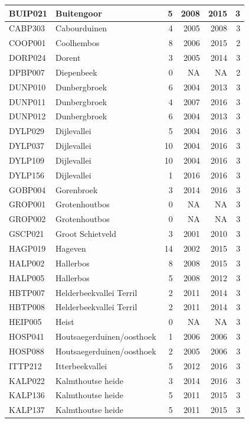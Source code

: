 \documentclass[11pt,]{book}
\begin{document}
\begin{table}
\begin{tabular}[t]{l|l|r|r|r|r}
\hline
BUIP021 & Buitengoor & 5 & 2008 & 2015 & 3\\
\hline
CABP303 & Cabourduinen & 4 & 2005 & 2008 & 3\\
\hline
COOP001 & Coolhembos & 8 & 2006 & 2015 & 2\\
\hline
DORP024 & Dorent & 3 & 2005 & 2014 & 3\\
\hline
DPBP007 & Diepenbeek & 0 & NA & NA & 2\\
\hline
DUNP010 & Dunbergbroek & 6 & 2004 & 2013 & 3\\
\hline
DUNP011 & Dunbergbroek & 4 & 2007 & 2016 & 3\\
\hline
DUNP012 & Dunbergbroek & 6 & 2004 & 2013 & 3\\
\hline
DYLP029 & Dijlevallei & 5 & 2004 & 2016 & 3\\
\hline
DYLP037 & Dijlevallei & 10 & 2004 & 2016 & 3\\
\hline
DYLP109 & Dijlevallei & 10 & 2004 & 2016 & 3\\
\hline
DYLP156 & Dijlevallei & 1 & 2016 & 2016 & 3\\
\hline
GOBP004 & Gorenbroek & 3 & 2014 & 2016 & 3\\
\hline
GROP001 & Grotenhoutbos & 0 & NA & NA & 3\\
\hline
GROP002 & Grotenhoutbos & 0 & NA & NA & 3\\
\hline
GSCP021 & Groot Schietveld & 3 & 2001 & 2010 & 3\\
\hline
HAGP019 & Hageven & 14 & 2002 & 2015 & 3\\
\hline
HALP002 & Hallerbos & 8 & 2008 & 2015 & 3\\
\hline
HALP005 & Hallerbos & 5 & 2008 & 2012 & 3\\
\hline
HBTP007 & Helderbeekvallei Terril & 2 & 2011 & 2014 & 3\\
\hline
HBTP008 & Helderbeekvallei Terril & 2 & 2011 & 2014 & 3\\
\hline
HEIP005 & Heist & 0 & NA & NA & 3\\
\hline
HOSP041 & Houtsaegerduinen/oosthoek & 1 & 2006 & 2006 & 3\\
\hline
HOSP088 & Houtsaegerduinen/oosthoek & 2 & 2005 & 2006 & 3\\
\hline
ITTP212 & Itterbeekvallei & 5 & 2012 & 2016 & 3\\
\hline
KALP022 & Kalmthoutse heide & 3 & 2014 & 2016 & 3\\
\hline
KALP136 & Kalmthoutse heide & 5 & 2011 & 2015 & 3\\
\hline
KALP137 & Kalmthoutse heide & 5 & 2011 & 2015 & 3\\

\end{tabular}
\end{table}
\end{document}
